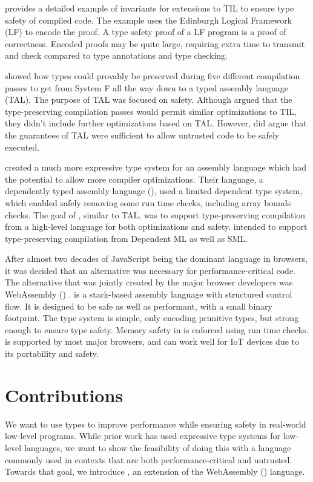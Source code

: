 \citet{PCC} provides a detailed example of invariants for extensions to TIL to ensure type safety of compiled code.
The example uses the Edinburgh Logical Framework (LF) to encode the proof.
A type safety proof of a LF program is a proof of correctness.
Encoded proofs may be quite large, requiring extra time to transmit and check compared to type annotations and type checking.

\citet{FtoTAL} showed how types could provably be preserved during five different compilation passes to get from System F all the way down to a typed assembly language (TAL).
The purpose of TAL was focused on safety.
Although \citet{FtoTAL} argued that the type-preserving compilation passes would permit similar optimizations to TIL, they didn't include further optimizations based on TAL.
However, \citet{FtoTAL} did argue that the guarantees of TAL were sufficient to allow untrusted code to be safely executed.

\citet{DTAL} created a much more expressive type system for an assembly language which had the potential to allow more compiler optimizations.
Their language, a dependently typed assembly language (\dtal), used a limited dependent type system, which enabled safely removing some run time checks, including array bounds checks.
The goal of \dtal, similar to TAL, was to support type-preserving compilation from a high-level language for both optimizations and safety.
\dtal intended to support type-preserving compilation from Dependent ML as well as SML.

After almost two decades of JavaScript being the dominant language in browsers, it was decided that an alternative was necessary for performance-critical code.
The alternative that was jointly created by the major browser developers was WebAssembly (\wasm) \cite{WASM}.
\wasm is a stack-based assembly language with structured control flow.
It is designed to be safe as well as performant, with a small binary footprint.
The \wasm type system is simple, only encoding primitive types, but strong enough to ensure type safety.
Memory safety in \wasm is enforced using run time checks.
\wasm is supported by most major browsers, and can work well for IoT devices due to its portability and safety.

\section{Contributions}
We want to use types to improve performance while ensuring safety in real-world low-level programs.
While prior work has used expressive type systems for low-level languages, we want to show the feasibility of doing this with a language commonly used in contexts that are both performance-critical and untrusted.
Towards that goal, we introduce \name, an extension of the WebAssembly (\wasm) language.


